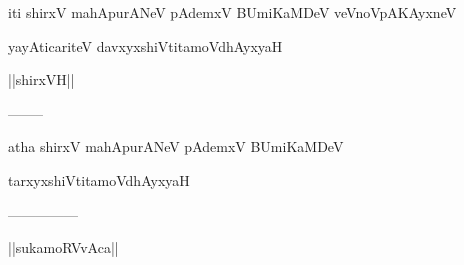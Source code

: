 \documentclass{article}
\begin{document}
\begin{center}
iti shirxV mahApurANeV pAdemxV BUmiKaMDeV veVnoVpAKAyxneV
\end{center}

\begin{center}
yayAticariteV davxyxshiVtitamoVdhAyxyaH
\end{center}

\begin{center}
||shirxVH||
\end{center}

\begin{center}
--------
\end{center}

\begin{center}
atha shirxV mahApurANeV pAdemxV BUmiKaMDeV
\end{center}

\begin{center}
tarxyxshiVtitamoVdhAyxyaH
\end{center}

\begin{center}

---------------
\end{center}

\begin{center}
||sukamoRVvAca||
\end{center}
\end{document}
